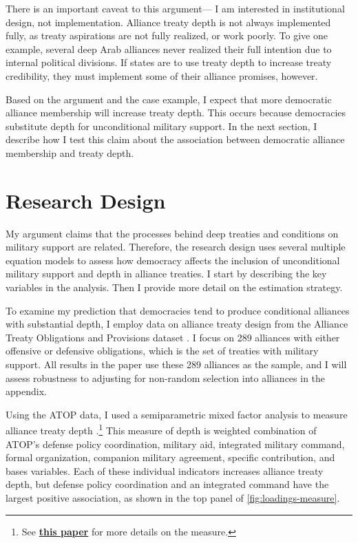 \documentclass[12pt]{article}
\begin{document}
There is an important caveat to this argument--- I am interested in institutional design, not implementation.
Alliance treaty depth is not always implemented fully, as treaty aspirations are not fully realized, or work poorly. 
To give one example, several deep Arab alliances never realized their full intention due to internal political divisions.  
If states are to use treaty depth to increase treaty credibility, they must implement some of their alliance promises, however. 


Based on the argument and the case example, I expect that more democratic alliance membership will increase treaty depth. 
This occurs because democracies substitute depth for unconditional military support. 
In the next section, I describe how I test this claim about the association between democratic alliance membership and treaty depth. 




\section{Research Design}


My argument claims that the processes behind deep treaties and conditions on military support are related. 
Therefore, the research design uses several multiple equation models to assess how democracy affects the inclusion of unconditional military support and depth in alliance treaties.
I start by describing the key variables in the analysis. 
Then I provide more detail on the estimation strategy. 


To examine my prediction that democracies tend to produce conditional alliances with substantial depth, I employ data on alliance treaty design from the Alliance Treaty Obligations and Provisions dataset \citep{Leedsetal2002}. 
I focus on 289 alliances with either offensive or defensive obligations, which is the set of treaties with military support. 
All results in the paper use these 289 alliances as the sample, and I will assess robustness to adjusting for non-random selection into alliances in the appendix. 


Using the ATOP data, I used a semiparametric mixed factor analysis to measure alliance treaty depth \citep{Murrayetal2013}.\footnote{See \textbf{\href{https://github.com/joshuaalley/arms-allies/blob/master/manuscript/arms-allies-paper.pdf}{this paper}} for more details on the measure.}
This measure of depth is weighted combination of ATOP's defense policy coordination, military aid, integrated military command, formal organization, companion military agreement, specific contribution, and bases variables. 
Each of these individual indicators increases alliance treaty depth, but defense policy coordination and an integrated command have the largest positive association, as shown in the top panel of \autoref{fig:loadings-measure}. 
\end{document}
